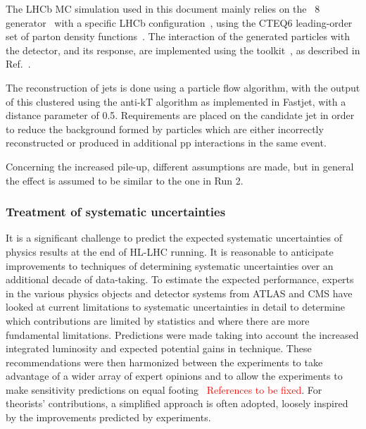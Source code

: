 The LHCb MC simulation used in this document mainly relies on the \pythia~8 generator~\cite{Sjostrand:2007gs} with a specific LHCb configuration~\cite{LHCb-PROC-2010-056}, using the CTEQ6 leading-order set of parton density functions~\cite{cteq6}. The interaction of the generated particles with the detector, and its response, are implemented using the \geant{} toolkit~\cite{Allison:2006ve,Agostinelli:2002hh}, as described in Ref.~\cite{LHCb-PROC-2011-006}. 

The reconstruction of jets is done using a particle flow algorithm, with the output of this clustered using
the anti-kT algorithm as implemented in Fastjet, with a distance parameter of
0.5. Requirements are placed on the candidate jet in order to reduce the background
formed by particles which are either incorrectly reconstructed or produced in additional pp interactions in the same event.

Concerning the increased pile-up, different assumptions are made, but in general the effect is assumed to be similar to the one in Run 2.


\subsubsection{Treatment of systematic uncertainties}
\label{sec:methods:syst}
It is a significant challenge to predict the expected systematic uncertainties of physics results at the end of HL-LHC running.
It is reasonable to anticipate improvements to techniques of determining systematic uncertainties over an additional decade of data-taking.
To estimate the expected performance, experts in the various physics objects and detector systems from ATLAS and CMS have looked at current limitations to
systematic uncertainties in detail to determine which contributions are limited by statistics and where there are more fundamental limitations.
Predictions were made taking into account the increased integrated luminosity and expected potential gains in technique.
These recommendations were then harmonized between the experiments to take advantage of a wider array of expert opinions and to allow the experiments to make sensitivity predictions on equal footing~\cite{ATLAS_PERF_Note,CMS_PERF_Note} \textcolor{red}{References to be fixed}. For theorists' contributions, a simplified approach is often adopted, loosely inspired by the improvements predicted by experiments. 

